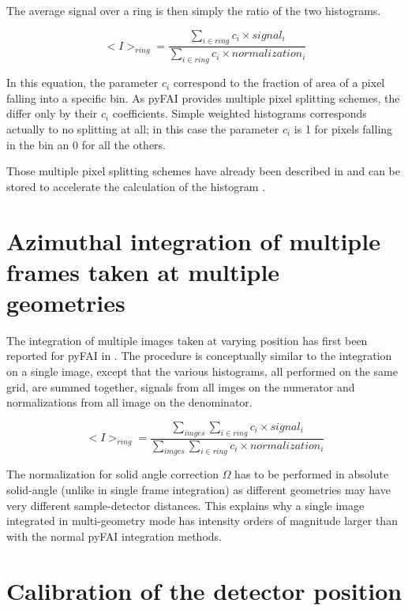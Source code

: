 \documentclass{iucr}              %
\begin{document}
The average signal over a ring is then simply the ratio of the two histograms.

$$
<I>_{ring} = \frac{\sum\limits_{i \in ring} c_i \times signal_i}
                  {\sum\limits_{i \in ring} c_i \times normalization_i} 
$$

In this equation, the parameter $c_i$ correspond to the fraction of area of a
pixel falling into a specific bin. 
As pyFAI provides multiple pixel splitting schemes, the differ only by their
$c_i$ coefficients. 
Simple weighted histograms corresponds actually to no splitting at all; in this
case the parameter $c_i$ is 1 for pixels falling in the bin an 0 for all the
others.
  
Those multiple pixel splitting schemes have already been described in
\cite{fv5028} and can be stored to accelerate the calculation of the
histogram \cite{kieffer_ashiotis-proc-euroscipy-2014}.

\section{Azimuthal integration of multiple frames taken at multiple geometries}

The integration of multiple images taken at varying position has first been
reported for pyFAI in \cite{PyFAI_PDJ}. 
The procedure is conceptually similar to the integration on a single image,
except that the various histograms, all performed on the same grid, are summed
together, signals from all imges on the numerator and normalizations from all
image on the denominator.

$$
<I>_{ring} = \frac{\sum\limits_{imges} \sum\limits_{i \in ring} c_i \times
signal_i} {\sum\limits_{imges} \sum\limits_{i \in ring} c_i \times
normalization_i} 
$$

The normalization for solid angle correction $\Omega$ has to be performed in
absolute solid-angle (unlike in single frame integration) as different
geometries may have very different sample-detector distances. 
This explains why a single image integrated in multi-geometry mode  has
intensity orders of magnitude larger than with the normal pyFAI integration
methods.

\section{Calibration of the detector position}
\end{document}
